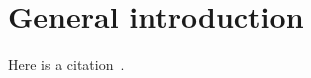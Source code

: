 \chapter[General introduction][General introduction]{General introduction}

Here is a citation~\cite{1999.ATLAS.Physics-TDR}.

